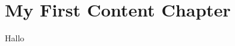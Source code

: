 \chapter{My First Content Chapter}
\label{chapterlabel2}

\blindtext
\blindtext
\citet{example-citation}
Hallo
\citep{example-citation}
\blindtext